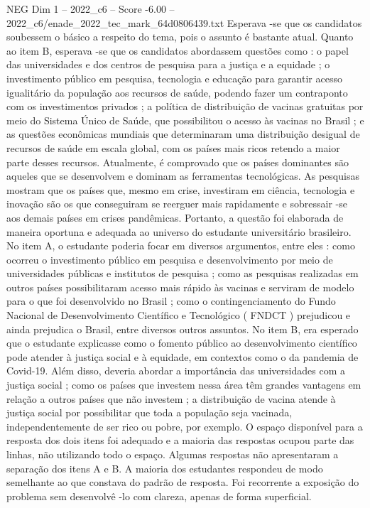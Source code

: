 \begin{textsample}{NEG Dim 1 – 2022\_c6 – Score -6.00 – 2022\_c6/enade\_2022\_tec\_mark\_64d0806439.txt}
Esperava -se que os candidatos soubessem o básico a respeito do tema, pois o assunto é bastante atual.
Quanto ao item B, esperava -se que os candidatos abordassem questões como : o papel das universidades e dos centros de pesquisa para a justiça e a equidade ; o investimento público em pesquisa, tecnologia e educação para garantir acesso igualitário da população aos recursos de saúde, podendo fazer um contraponto com os investimentos privados ; a política de distribuição de vacinas gratuitas por meio do Sistema Único de Saúde, que possibilitou o acesso às vacinas no Brasil ; e as questões econômicas mundiais que determinaram uma distribuição desigual de recursos de saúde em escala global, com os países mais ricos retendo a maior parte desses recursos.
Atualmente, é comprovado que os países dominantes são aqueles que se desenvolvem e dominam as ferramentas tecnológicas.
As pesquisas mostram que os países que, mesmo em crise, investiram em ciência, tecnologia e inovação são os que conseguiram se reerguer mais rapidamente e sobressair -se aos demais países em crises pandêmicas.
Portanto, a questão foi elaborada de maneira oportuna e adequada ao universo do estudante universitário brasileiro.
No item A, o estudante poderia focar em diversos argumentos, entre eles : como ocorreu o investimento público em pesquisa e desenvolvimento por meio de universidades públicas e institutos de pesquisa ; como as pesquisas realizadas em outros países possibilitaram acesso mais rápido às vacinas e serviram de modelo para o que foi desenvolvido no Brasil ; como o contingenciamento do Fundo Nacional de Desenvolvimento Científico e Tecnológico ( FNDCT ) prejudicou e ainda prejudica o Brasil, entre diversos outros assuntos.
No item B, era esperado que o estudante explicasse como o fomento público ao desenvolvimento científico pode atender à justiça social e à equidade, em contextos como o da pandemia de Covid-19.
Além disso, deveria abordar a importância das universidades com a justiça social ; como os países que investem nessa área têm grandes vantagens em relação a outros países que não investem ; a distribuição de vacina atende à justiça social por possibilitar que toda a população seja vacinada, independentemente de ser rico ou pobre, por exemplo.
O espaço disponível para a resposta dos dois itens foi adequado e a maioria das respostas ocupou parte das linhas, não utilizando todo o espaço.
Algumas respostas não apresentaram a separação dos itens A e B.
A maioria dos estudantes respondeu de modo semelhante ao que constava do padrão de resposta.
Foi recorrente a exposição do problema sem desenvolvê -lo com clareza, apenas de forma superficial.

\end{textsample}
